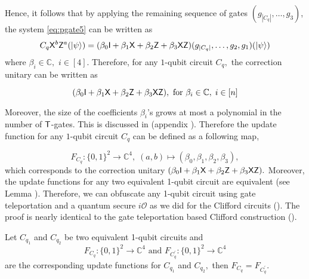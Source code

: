 Hence, it follows that by applying the remaining  sequence of gates $(g_{|C_q|},\ldots,g_3)$, the system \ref{eq:pgate5} can be written as
\begin{equation}
\begin{aligned}
\label{eq:pgate8}
C_q {\sf X}^b{\sf Z}^a ({\lvert}\psi\rangle)=(\beta_0 {\sf I} +  \beta_1 {\sf X} + \beta_2 {\sf Z} + \beta_3{\sf X} {\sf Z})(g_{|C_q|},\ldots,g_2,g_1 )({\lvert}\psi\rangle)
\end{aligned}
\end{equation}
where $\beta_i  \in \mathbb{C},$ $i\in[4].$  Therefore, for any  $1$-qubit circuit $C_q,$ the correction unitary can be written as

\begin{equation}
\label{eq:pgate9}
 (\beta_0 {\sf I} +   \beta_1 {\sf X} +  \beta_2 {\sf Z} +  \beta_3 {\sf X}{\sf Z}), \mbox{ for }  \beta_i \in \mathbb{C},\; i\in[n]
\end{equation}

Moreover, the size of the coefficients $\beta_i$'s grows at most a polynomial in the number of ${\sf T}$-gates. This is discussed in (appendix ). Therefore the update function for any $1$-qubit circuit $C_q$ can be defined as a following map,

\begin{equation*}
F_{C_q}:\{0,1\}^2\rightarrow \mathbb{C}^4,\; (a,b)\mapsto (\beta_0, \beta_1,\beta_2,\beta_3),
\end{equation*}
which corresponds to the correction unitary $(\beta_0 {\sf I} +  \beta_1 {\sf X} + \beta_2 {\sf Z} + \beta_3{\sf X} {\sf Z}).$
Moreover, the update functions for any two equivalent 1-qubit circuit are equivalent (see Lemma ). Therefore, we can obfuscate any 1-qubit circuit using gate teleportation and a quantum secure $i\mathcal{O}$ as we did for the Clifford circuits (). The proof is nearly identical to the gate teleportation based Clifford construction ().



\begin{lemma}
\label{lemma:1qubit}
Let $C_{q_1}$ and $C_{q_2}$ be two equivalent 1-qubit circuits and
\begin{equation*}
F_{C_q}:\{0,1\}^2\rightarrow \mathbb{C}^4 \mbox{ and } F_{C_q^\prime}:\{0,1\}^2\rightarrow \mathbb{C}^4
\end{equation*}
are the corresponding update functions for $C_{q_1}$  and $C_{q_2},$   then $F_{C_q}=F_{C_q^\prime}.$
\end{lemma}

